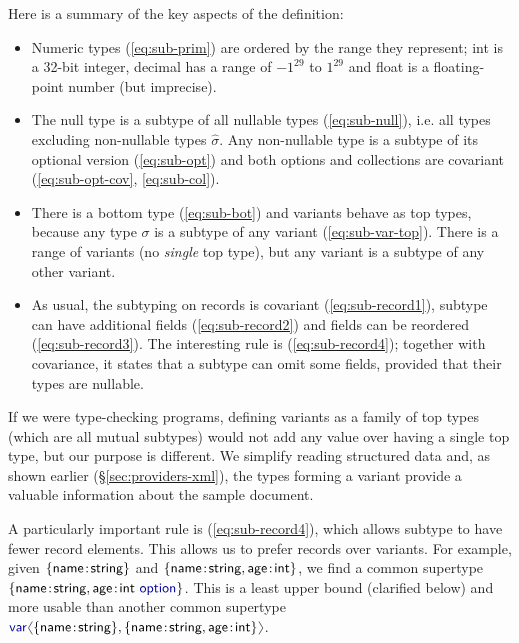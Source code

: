 \documentclass[10pt,preprint,blind,clearpagebib]{sigplanconf}
\newcommand{\langl}{\begin{picture}(4.5,7)
\put(1.1,2.5){\rotatebox{60}{\line(1,0){5.5}}}
\put(1.1,2.5){\rotatebox{300}{\line(1,0){5.5}}}
\end{picture}}
\newcommand{\rangl}{\begin{picture}(4.5,7)
\put(.9,2.5){\rotatebox{120}{\line(1,0){5.5}}}
\put(.9,2.5){\rotatebox{240}{\line(1,0){5.5}}}
\end{picture}}
\newcommand{\kvd}[1]{\textnormal{\textcolor{kvdclr}{\sffamily #1}}}
\newcommand{\ident}[1]{\textnormal{\sffamily #1}}
\begin{document}

\noindent
Here is a summary of the key aspects of the definition:
\begin{itemize}
\item Numeric types (\ref{eq:sub-prim}) are ordered by the range they represent;
  \ident{int} is a 32-bit integer, \ident{decimal} has a range of $-1^{29}$ to $1^{29}$ and 
  \ident{float} is a floating-point number (but imprecise).

\item The \kvd{null} type is a subtype of all nullable types (\ref{eq:sub-null}), i.e. all 
  types excluding non-nullable types $\hat{\sigma}$. Any non-nullable type is a 
  subtype of its optional version (\ref{eq:sub-opt}) and both options and collections are 
  covariant (\ref{eq:sub-opt-cov}, \ref{eq:sub-col}).

\item There is a bottom type (\ref{eq:sub-bot}) and variants behave as top types, because
  any type $\sigma$ is a subtype of any variant (\ref{eq:sub-var-top}). There is a range of
  variants (no \emph{single} top type), but any variant is a subtype of any other variant.

\item As usual, the subtyping on records is covariant (\ref{eq:sub-record1}), subtype can have 
  additional fields (\ref{eq:sub-record2}) and fields can  be reordered (\ref{eq:sub-record3}). 
  The interesting rule is (\ref{eq:sub-record4}); together with covariance, it states that a 
  subtype can omit some fields, provided that their types are nullable.
\end{itemize}

\noindent
If we were type-checking programs, defining variants as a family of top types (which are all 
mutual subtypes) would not add any value over having a single top type, but our purpose is 
different. We simplify reading structured data and, as shown earlier (\S\ref{sec:providers-xml}), 
the types forming a variant provide a valuable information about the sample document.

A particularly important rule is (\ref{eq:sub-record4}), which allows subtype to have fewer record 
elements. This allows us to prefer records over variants. For example, given 
$\{ \ident{name}\!:\!\ident{string} \}$ and $\{ \ident{name}\!:\!\ident{string}, \ident{age}\!:\!\ident{int} \}$,
we find a common supertype $\{ \ident{name}\!:\!\ident{string}, \ident{age}\!:\!\ident{int}~\kvd{option} \}$.
This is a least upper bound (clarified below) and more usable than another common supertype 
$\kvd{var}\langl \{ \ident{name}\!:\!\ident{string} \}, \{ \ident{name}\!:\!\ident{string}, \ident{age}\!:\!\ident{int} \}\rangl$.
\end{document}
